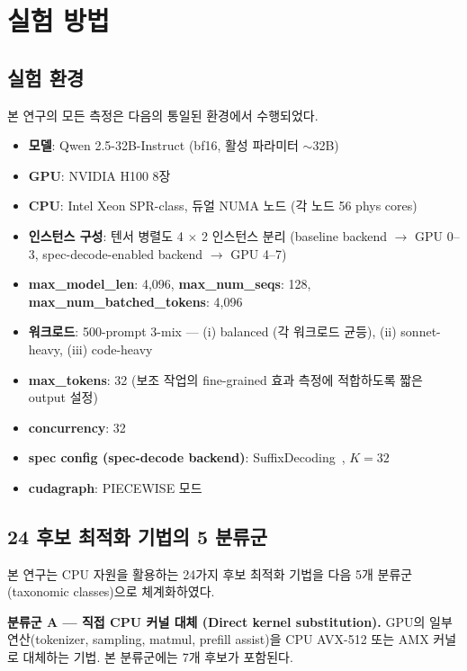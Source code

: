 
\section{실험 방법}
\label{sec:methodology}

\subsection{실험 환경}
\label{subsec:setup}

본 연구의 모든 측정은 다음의 통일된 환경에서 수행되었다.

\begin{itemize}
  \item \textbf{모델}: Qwen 2.5-32B-Instruct (bf16, 활성 파라미터 $\sim$32B)
  \item \textbf{GPU}: NVIDIA H100 8장
  \item \textbf{CPU}: Intel Xeon SPR-class, 듀얼 NUMA 노드 (각 노드 56 phys cores)
  \item \textbf{인스턴스 구성}: 텐서 병렬도 4 $\times$ 2 인스턴스 분리 (baseline backend $\rightarrow$ GPU 0--3, spec-decode-enabled backend $\rightarrow$ GPU 4--7)
  \item \textbf{max\_model\_len}: 4{,}096, \textbf{max\_num\_seqs}: 128, \textbf{max\_num\_batched\_tokens}: 4{,}096
  \item \textbf{워크로드}: 500-prompt 3-mix --- (i) balanced (각 워크로드 균등), (ii) sonnet-heavy, (iii) code-heavy
  \item \textbf{max\_tokens}: 32 (보조 작업의 fine-grained 효과 측정에 적합하도록 짧은 output 설정)
  \item \textbf{concurrency}: 32
  \item \textbf{spec config (spec-decode backend)}: SuffixDecoding~\cite{snowflake-arctic}, $K=32$
  \item \textbf{cudagraph}: PIECEWISE 모드
\end{itemize}

\subsection{24 후보 최적화 기법의 5 분류군}
\label{subsec:taxonomy}

본 연구는 CPU 자원을 활용하는 24가지 후보 최적화 기법을 다음 5개 분류군(taxonomic classes)으로 체계화하였다.

\textbf{분류군 A --- 직접 CPU 커널 대체 (Direct kernel substitution).}
GPU의 일부 연산(tokenizer, sampling, matmul, prefill assist)을 CPU AVX-512 또는 AMX 커널로 대체하는 기법. 본 분류군에는 7개 후보가 포함된다.

